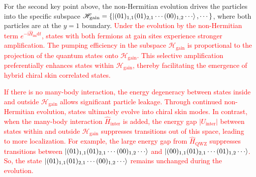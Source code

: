 \documentclass[longbibliography, aps, prx, amsmath, amssymb, amsfonts, twocolumn,superscriptaddress, footinbib]{revtex4-1}
\begin{document}
	
	For the second key point above, the non-Hermitian evolution drives the particles into the specific subspace
	$\mathscr{H}_{\text{gain}}=\left\{ \ket{(01)_{1,1}(01)_{2,1}\cdots(00)_{1,2}\cdots}, \cdots \right\}$,
	where both particles are at the $y=1$ boundary.
	\textcolor{red}{
	Under the evolution by the non-Hermitian term $e^{-\mathrm{i}\hat{H}_{\text{im}} \mathrm{d}t}$, 
	states with both fermions at gain sites experience stronger amplification.
	The pumping efficiency in the subspace $\mathscr{H}_{\text{gain}}$ is proportional to the projection of the quantum states onto  $\mathscr{H}_{\text{gain}}$. 
	This selective amplification preferentially enhances states within $\mathscr{H}_{\text{gain}}$, thereby facilitating the emergence of hybrid chiral skin correlated states.
	}

    \textcolor{red}{
    If there is no many-body interaction, the energy degeneracy between states inside and outside $\mathscr{H}_{\text{gain}}$ allows significant particle leakage.
	Through continued non-Hermitian evolution, states ultimately evolve into chiral skin modes.
	In contrast, when the many-body interaction $\hat{H}_{\text{inter}}$ is added, the energy gap $\vert U_{\text{inter}} \vert$ between states within and outside $\mathscr{H}_{\text{gain}}$ suppresses transitions out of this space, leading to more localization. For example, 
	the large energy gap from $\hat{H}_{\text{QWZ}}$ suppresses transitions between $\ket{(01)_{1,1}(01)_{2,1}\cdots(00)_{1,2}\cdots}$ and $\ket{(00)_{1,1}(01)_{2,1}\cdots(01)_{1,2}\cdots}$. 
	So, the state $\ket{(01)_{1,1}(01)_{2,1}\cdots(00)_{1,2}\cdots}$ remains unchanged during the evolution.
	}
\end{document}
